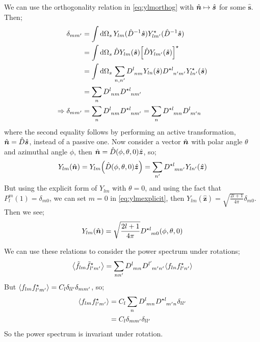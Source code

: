 We can use the orthogonality relation in \eqref{eq:ylmorthog} with $\hat{\bm{n}} \mapsto \hat{\bm{s}}$ for some $\hat{\bm{s}}$. Then;
\begin{align*}
\delta_{m m\pr} &= \int{\upd{\Omega_s} Y_{lm}(\hat{D}^{-1}\hat{\bm{s}}) Y^{\star}_{l m\pr}(\hat{D}^{-1}\hat{\bm{s}})} \\
&= \int{\upd{\Omega_s} \hat{D}Y_{lm}(\hat{\bm{s}})\left[\hat{D}Y_{l m\pr}(\hat{\bm{s}})\right]^{\star}} \\
&= \int{\upd{\Omega_s}\sum_{n, n\pr}{D\indices{^{l}_{nm}}Y_{ln}(\hat{\bm{s}})D\indices{^{\star l}_{n\pr m\pr}}Y^{\star}_{l n\pr}(\hat{\bm{s}})}} \\
&= \sum_{n}{D\indices{^{l}_{nm}}D\indices{^{\star l}_{n m\pr}}} \\
\Rightarrow \delta_{m m\pr} &= \sum_{n}{D\indices{^{l}_{nm}}D\indices{^{\star l}_{n m\pr}}} = \sum_{n}{D\indices{^{\star l}_{mn}}D\indices{^{l}_{m\pr n}}}
\end{align*}
where the second equality follows by performing an active transformation, $\hat{\bm{n}} = \hat{D}\hat{\bm{s}}$, instead of a passive one. Now consider a vector $\hat{\bm{n}}$ with polar angle $\theta$ and azimuthal angle $\phi$, then $\hat{\bm{n}} = \hat{D}(\phi, \theta, 0)\hat{\bm{z}}$, so;
\begin{equation*}
Y_{lm}(\nhat) = Y_{lm}\left(\hat{D}(\phi, \theta, 0)\hat{\bm{z}}\right) = \sum_{n\pr}{D\indices{^{\star l}_{m n\pr}}Y_{l n\pr}(\hat{\bm{z}})}
\end{equation*}
But using the explicit form of $Y_{lm}$ with $\theta = 0$, and using the fact that $P^{m}_{l}(1) = \delta_{m 0}$, we can set $m = 0$ in \eqref{eq:ylmexplicit}, then $Y_{lm}(\hat{\bm{z}}) = \sqrt{\tfrac{2l + 1}{4\pi}}\delta_{m 0}$. Then we see;
\begin{equation}
Y_{lm}(\nhat) = \sqrt{\frac{2l + 1}{4\pi}}D\indices{^{\star l}_{m 0}}(\phi, \theta, 0)
\end{equation}
\begin{examplebox}
We can use these relations to consider the power spectrum under rotations;
\begin{equation*}
\left< \tilde{f}_{lm}\tilde{f}^{\star}_{l\pr m\pr} \right> = \sum_{n n\pr}{D\indices{^{l}_{mn}}D\indices{^{l\pr}_{m\pr n\pr}}\left< f_{ln} f_{l\pr n\pr}^{\star} \right>}
\end{equation*}
But $\left< f_{lm}f_{l\pr m\pr}^{\star} \right> = C_l \delta_{l l\pr}\delta_{m m\pr}$, so;
\begin{align}
\left< f_{lm}f_{l\pr m\pr}^{\star} \right> &= C_l \sum_{n}{D\indices{^{l}_{mn}}D\indices{^{\star l}_{m\pr n}} \delta_{l l\pr}} \\
&= C_l \delta_{m m\pr} \delta_{l l\pr}
\end{align}
So the power spectrum is invariant under rotation. 
\end{examplebox}
